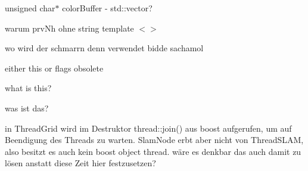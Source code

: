 \begin{DoxyRefList}
unsigned char$\ast$ color\-Buffer -\/ std\-::vector?  
\item[\label{todo__todo000015}%
\hypertarget{todo__todo000015}{}%
Member \hyperlink{classohm__tsd__slam__ref_1_1ThreadGrid_a23ff222ecd6e64afde2e8c926e40889c}{ohm\-\_\-tsd\-\_\-slam\-\_\-ref\-:\-:Thread\-Grid\-:\-:Thread\-Grid} (obvious\-::\-Tsd\-Grid $\ast$grid, ros\-::\-Node\-Handle $\ast$const nh, const double x\-Offset, const double y\-Offset)]warum prv\-Nh ohne string template $<$$>$  
\item[\label{todo__todo000021}%
\hypertarget{todo__todo000021}{}%
Member \hyperlink{classohm__tsd__slam__ref_1_1ThreadLocalize_a45c7b109a3a9f22e0c60111c58eb0dd3}{ohm\-\_\-tsd\-\_\-slam\-\_\-ref\-:\-:Thread\-Localize\-:\-:\-\_\-assigner} ]wo wird der schmarrn denn verwendet bidde sachamol  
\item[\label{todo__todo000019}%
\hypertarget{todo__todo000019}{}%
Member \hyperlink{classohm__tsd__slam__ref_1_1ThreadLocalize_ad1b612e37ab54ffe1958cac7d5f9c89c}{ohm\-\_\-tsd\-\_\-slam\-\_\-ref\-:\-:Thread\-Localize\-:\-:\-\_\-data\-Mutex} ]either this or flags obsolete  
\item[\label{todo__todo000022}%
\hypertarget{todo__todo000022}{}%
Member \hyperlink{classohm__tsd__slam__ref_1_1ThreadLocalize_a4444f42e17414907a35919adc4904268}{ohm\-\_\-tsd\-\_\-slam\-\_\-ref\-:\-:Thread\-Localize\-:\-:\-\_\-filter\-Reciprocal} ]what is this?  
\item[\label{todo__todo000020}%
\hypertarget{todo__todo000020}{}%
Member \hyperlink{classohm__tsd__slam__ref_1_1ThreadLocalize_a2e9f4af9a78a5c16b1a4966b1e28a27b}{ohm\-\_\-tsd\-\_\-slam\-\_\-ref\-:\-:Thread\-Localize\-:\-:\-\_\-ran\-Eps\-Thresh} ]was ist das?  
\item[\label{todo__todo000006}%
\hypertarget{todo__todo000006}{}%
Member \hyperlink{SlamNode_8h_a502d892a0b86363c94e2f11fb2370346}{T\-H\-R\-E\-A\-D\-\_\-\-T\-E\-R\-M\-\_\-\-M\-S} ]in Thread\-Grid wird im Destruktor thread\-::join() aus boost aufgerufen, um auf Beendigung des Threads zu warten. Slam\-Node erbt aber nicht von Thread\-S\-L\-A\-M, also besitzt es auch kein boost object thread. wäre es denkbar das auch damit zu lösen anstatt diese Zeit hier festzusetzen? 
\end{DoxyRefList}